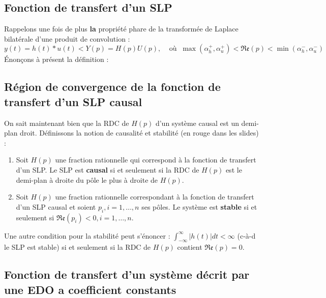 \subsection{Fonction de transfert d'un SLP}
Rappelons une fois de plus \textbf{la} propriété phare de la transformée de Laplace
bilatérale d'une produit de convolution :
\begin{equation}
	y(t) = h(t)*u(t) \lt Y(p) = H(p)U(p), \ \ \ \ \ \text{où }\ \max(\alpha_h^+,
	\alpha_u^+) < \mathfrak{Re}(p)< \min(\alpha_h^-,\alpha_u^-)
\end{equation}
Énonçons à présent la définition :
	
	
	
\subsection{Région de convergence de la fonction de transfert d'un SLP causal}
On sait maintenant bien que la RDC de $H(p)$ d'un système causal est un demi-plan
droit. Définissons la notion de causalité et stabilité (en rouge dans les slides) :
	
\begin{enumerate}
	\item Soit $H(p)$ une fraction rationnelle qui correspond à la fonction de transfert 
	      d’un SLP. Le SLP est \textbf{causal} si et seulement si la RDC de $H(p)$ est le demi-plan
	      à droite du pôle le plus à droite de $H(p)$.
	\item Soit $H(p)$ une fraction rationnelle correspondant à la fonction de transfert d’un 
	      SLP causal et soient $p_i, i=1,\dots,n$ ses pôles. Le système est \textbf{stable} si et 
	      seulement si $\mathfrak{Re}(p_i) <0, i=1,\dots,n$.
\end{enumerate}
Une autre condition pour la stabilité peut s'énoncer : $\int_{-\infty}^\infty |h(t)|dt <
\infty$ (c-à-d le SLP est stable) si et seulement si la RDC de $H(p)$ contient $\mathfrak{
	Re}(p) = 0$.
	
	
\subsection{Fonction de transfert d'un système décrit par une EDO a coefficient constants}
